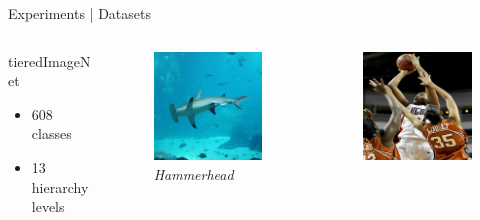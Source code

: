 \begin{frame}{Experiments | Datasets}
  \begin{columns}
    \begin{column}{0.35\textwidth}
      \alert{{\large tieredImageNet}}
      \begin{itemize}
        \item 608 classes
        \item 13 hierarchy levels
      \end{itemize}
    \end{column}
    \begin{column}{0.2\textwidth}
      \begin{figure}
        \centering
        \includegraphics[width=.7\linewidth]{figures/tieredImageNet/example_1.jpg}
        \captionsetup{labelformat=empty, justification=centering, font=scriptsize}
        \caption{\emph{Hammerhead}}
      \end{figure}
    \end{column}
    \begin{column}{0.2\textwidth}
      \begin{figure}
        \centering
        \includegraphics[width=.7\linewidth]{figures/tieredImageNet/example_2.jpg}

\end{figure}
\end{column}
\end{columns}
\end{frame}
